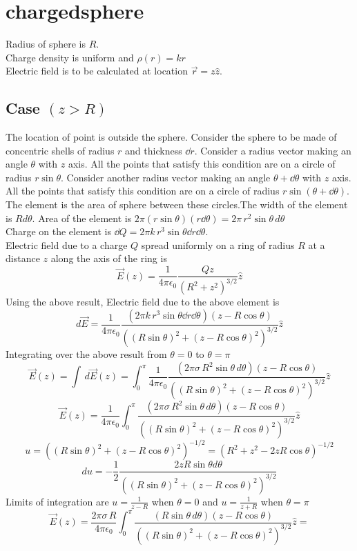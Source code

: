 
\section*{chargedsphere}
Radius of sphere is $R$.\\
Charge density is uniform  and $\rho(r)=kr$\\
Electric field is to be calculated at location $\vec{r}=z\hat{z}$.
\subsection*{Case $(z>R)$} 
The location of point is outside the sphere.
Consider the sphere to be made of concentric shells of radius $r$ and thickness $\dd r$. Consider a radius vector making an angle $\theta$ with $z$ axis. All the points that satisfy this condition are on a circle of radius $r\sin{\theta}$. Consider another radius vector making an angle $\theta+\dd\theta$ with $z$ axis. All the points that satisfy this condition are on a circle of radius $r\sin{(\theta+\dd\theta)}$. The element is the area of sphere between these circles.The width of the element is $Rd\theta$. Area of the element is $2\pi(r\sin{\theta})(r\dd\theta)=2\pi\,r^2\sin{\theta}\,d\theta$\\
Charge on the element is $\dd Q=2\pi k\,r^3\sin{\theta}\dd r\dd\theta$.\\
Electric field due to a charge $Q$ spread uniformly on a ring of radius $R$ at a distance $z$ along the axis of the ring is $$\vec{E}(z)=\frac{1}{4\pi\epsilon_0}\frac{Qz}{(R^2+z^2)^{3/2}}\hat{z}$$
Using the above result,
Electric field due to the above element is $$d\vec{E}=\frac{1}{4\pi\epsilon_0}\frac{(2\pi k\,r^3\sin{\theta}\dd r\dd\theta)(z-R\cos{\theta})}{((R\sin{\theta})^2+(z-R\cos{\theta})^2)^{3/2}}\hat{z}$$
Integrating over the above result from $\theta=0$ to $\theta=\pi$
$$\vec{E}(z)=\int\,d\vec{E}(z)=\int_{0}^{\pi}\frac{1}{4\pi\epsilon_0}\frac{(2\pi\sigma\,R^2\sin{\theta}\,d\theta)(z-R\cos{\theta})}{((R\sin{\theta})^2+(z-R\cos{\theta})^2)^{3/2}}\hat{z}$$
$$\vec{E}(z)=\frac{1}{4\pi\epsilon_0}\int_{0}^{\pi}\frac{(2\pi\sigma\,R^2\sin{\theta}\,d\theta)(z-R\cos{\theta})}{((R\sin{\theta})^2+(z-R\cos{\theta})^2)^{3/2}}\hat{z}$$
$$u=((R\sin{\theta})^2+(z-R\cos{\theta})^2)^{-1/2}=(R^2+z^2-2zR\cos{\theta})^{-1/2}$$
$$du=-\frac{1}{2}\frac{2zR\sin{\theta}d{\theta}}{((R\sin{\theta})^2+(z-R\cos{\theta})^2)^{3/2}}$$
Limits of integration are $u=\frac{1}{z-R}$ when $\theta=0$ and $u=\frac{1}{z+R}$ when $\theta=\pi$
$$\vec{E}(z)=\frac{2\pi\sigma\,R}{4\pi\epsilon_0}\int_{0}^{\pi}\frac{(R\sin{\theta}\,d\theta)(z-R\cos{\theta})}{((R\sin{\theta})^2+(z-R\cos{\theta})^2)^{3/2}}\hat{z}=
$$
